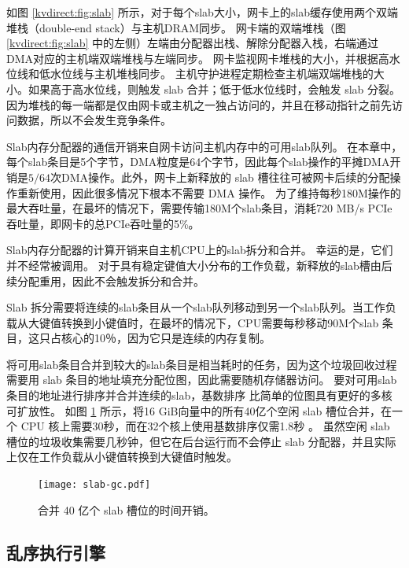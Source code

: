 如图 \ref {kvdirect:fig:slab} 所示，对于每个slab大小，网卡上的slab缓存使用两个双端堆栈（double-end stack）与主机DRAM同步。
网卡端的双端堆栈（图 \ref {kvdirect:fig:slab} 中的左侧）左端由分配器出栈、解除分配器入栈，右端通过DMA对应的​​主机端双端堆栈与左端同步。
网卡监视网卡堆栈的大小，并根据高水位线和低水位线与主机堆栈同步。
主机守护进程定期检查主机端双端堆栈的大小。如果高于高水位线，则触发 slab 合并；低于低水位线时，会触发 slab 分裂。
因为堆栈的每一端都是仅由网卡或主机之一独占访问的，并且在移动指针之前先访问数据，所以不会发生竞争条件。


\label{kvdirect:sec:slab-eval}


Slab内存分配器的通信开销来自网卡访问主机内存中的可用slab队列。
在本章中，每个slab条目是5个字节，DMA粒度是64个字节，因此每个slab操作的平摊DMA开销是$5/64$次DMA操作。此外，网卡上新释放的 slab 槽往往可被网卡后续的分配操作重新使用，因此很多情况下根本不需要 DMA 操作。
为了维持每秒180M操作的最大吞吐量，在最坏的情况下，需要传输180M个slab条目，消耗720 MB/s PCIe吞吐量，即网卡的总PCIe吞吐量的5\%。

Slab内存分配器的计算开销来自主机CPU上的slab拆分和合并。
幸运的是，它们并不经常被调用。
对于具有稳定键值大小分布的工作负载，新释放的slab槽由后续分配重用，因此不会触发拆分和合并。

Slab 拆分需要将连续的slab条目从一个slab队列移动到另一个slab队列。当工作负载从大键值转换到小键值时，在最坏的情况下，CPU需要每秒移动90M个slab 条目，这只占核心的10％，因为它只是连续的内存复制。

将可用slab条目合并到较大的slab条目是相当耗时的任务，因为这个垃圾回收过程需要用 slab 条目的地址填充分配位图，因此需要随机存储器访问。
要对可用slab条目的地址进行排序并合并连续的slab，基数排序 \cite {satish2010fast} 比简单的位图具有更好的多核可扩放性。
如图 \ref {kvdirect:fig:slab-garbage-collection} 所示，将16 GiB向量中的所有40亿个空闲 slab 槽位合并，在一个 CPU 核上需要30秒，而在32个核上使用基数排序仅需1.8秒 \cite{satish2010fast}。
虽然空闲 slab 槽位的垃圾收集需要几秒钟，但它在后台运行而不会停止 slab 分配器，并且实际上仅在工作负载从小键值转换到大键值时触发。


\begin{figure}[t]
	\centering
	\texttt{[image: slab-gc.pdf]}
	\caption{合并 40 亿个 slab 槽位的时间开销。}
	\label{kvdirect:fig:slab-garbage-collection}
\end{figure}




\subsection{乱序执行引擎}
\label{kvdirect:sec:ooo}

